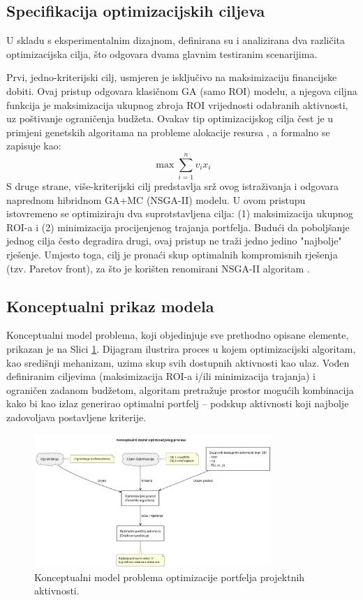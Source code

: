 \subsection{Specifikacija optimizacijskih ciljeva}
U skladu s eksperimentalnim dizajnom, definirana su i analizirana dva različita optimizacijska cilja, što odgovara dvama glavnim testiranim scenarijima.

Prvi, jedno-kriterijski cilj, usmjeren je isključivo na maksimizaciju financijske dobiti. Ovaj pristup odgovara klasičnom GA (samo ROI) modelu, a njegova ciljna funkcija je maksimizacija ukupnog zbroja ROI vrijednosti odabranih aktivnosti, uz poštivanje ograničenja budžeta. Ovakav tip optimizacijskog cilja čest je u primjeni genetskih algoritama na probleme alokacije resursa \cite{Goldberg1989}, a formalno se zapisuje kao:
$$
\max \sum_{i=1}^n v_i x_i
$$
S druge strane, više-kriterijski cilj predstavlja srž ovog istraživanja i odgovara naprednom hibridnom GA+MC (NSGA-II) modelu. U ovom pristupu istovremeno se optimiziraju dva suprotstavljena cilja: (1) maksimizacija ukupnog ROI-a i (2) minimizacija procijenjenog trajanja portfelja. Budući da poboljšanje jednog cilja često degradira drugi, ovaj pristup ne traži jedno jedino "najbolje" rješenje. Umjesto toga, cilj je pronaći skup optimalnih kompromisnih rješenja (tzv. Paretov front), za što je korišten renomirani NSGA-II algoritam \cite{Deb2002}.

\subsection{Konceptualni prikaz modela}
Konceptualni model problema, koji objedinjuje sve prethodno opisane elemente, prikazan je na Slici \ref{fig:konceptualni_model}. Dijagram ilustrira proces u kojem optimizacijski algoritam, kao središnji mehanizam, uzima skup svih dostupnih aktivnosti kao ulaz. Vođen definiranim ciljevima (maksimizacija ROI-a i/ili minimizacija trajanja) i ograničen zadanom budžetom, algoritam pretražuje prostor mogućih kombinacija kako bi kao izlaz generirao optimalni portfelj – podskup aktivnosti koji najbolje zadovoljava postavljene kriterije.

\begin{figure}[H]
    \centering
    \includegraphics[width=0.8\textwidth]{slike/model_problema.png}
    \caption{Konceptualni model problema optimizacije portfelja projektnih aktivnosti.}
    \label{fig:konceptualni_model}
\end{figure}

